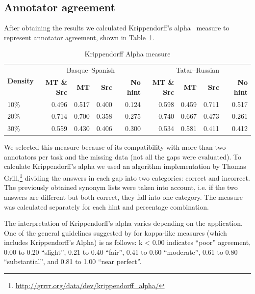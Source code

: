 \documentclass[11pt]{article}
\begin{document}
\subsection{Annotator agreement}
After obtaining the results we calculated Krippendorff's alpha~\citep{krippendorff70} measure to represent annotator agreement, shown in Table~\ref{table:alpha}. 
\begin{table}
\centering
  \begin{tabular}{|l|r|r|r|r|r|r|r|r|}
  \hline
 \multirow{2}{*}{\textbf{Density}} & \multicolumn{4}{|c|}{Basque--Spanish}&\multicolumn{4}{|c|}{Tatar--Russian} \\\cline{2-9}
                                            & \textbf{MT \& Src} & \textbf{MT} & \textbf{Src} & \textbf{No hint}& \textbf{MT \& Src} & \textbf{MT} & \textbf{Src} & \textbf{No hint} \\
\hline
10\%&0.496&0.517&0.400&0.124&0.598&0.459 &0.711 &0.517\\
20\%&0.714&0.700&0.358&0.275&0.740&0.667 &0.473 &0.261\\
30\%&0.559&0.430&0.406&0.300&0.534&0.581 &0.411 &0.412\\

\hline
\end{tabular}
\caption{Krippendorff Alpha measure} 
\label{table:alpha}
\end{table}

We selected this measure because of its compatibility with more than two annotators per task and the missing data (not all the gaps were evaluated). To calculate Krippendorff's alpha we used an algorithm implementation by Thomas Grill,\footnote{\url{http://grrrr.org/data/dev/krippendorff_alpha/}} dividing the answers in each gap into two categories: correct and incorrect. The previously obtained synonym lists were taken into account, i.e. if the two answers are different but both correct, they fall into one category. The measure was calculated separately for each hint and percentage combination.

The interpretation of Krippendorff's alpha varies depending on the application. One of the general guidelines suggested by \citet{landis77} for kappa-like measures (which includes Krippendorff's Alpha) is as follows: k < 0.00 indicates ``poor'' agreement, 0.00 to 0.20 ``slight'', 0.21 to 0.40 ``fair'', 0.41 to 0.60 ``moderate'', 0.61 to 0.80 ``substantial'', and 0.81 to 1.00 ``near perfect''.
\end{document}
